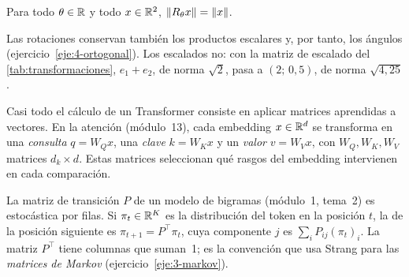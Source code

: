 \addtocounter{figure}{1}%

\begin{proposicion}\label{prop:rotacion}
Para todo $\theta\in\mathbb{R}$ y todo $x\in\mathbb{R}^{2}$, $\lVert R_\theta x\rVert=\lVert x\rVert$.
\end{proposicion}

Las rotaciones conservan también los productos escalares y, por tanto, los ángulos (ejercicio~\ref{eje:4-ortogonal}). Los escalados no: con la matriz de escalado del \cref{tab:transformaciones}, $e_1+e_2$, de norma $\sqrt2$, pasa a $(2;\,0{,}5)$, de norma $\sqrt{4{,}25}$.

\begin{observacion}\label{obs:qkv}
Casi todo el cálculo de un Transformer consiste en aplicar matrices aprendidas a vectores. En la atención (módulo~13), cada embedding $x\in\mathbb{R}^{d}$ se transforma en una \emph{consulta} $q=W_Qx$, una \emph{clave} $k=W_Kx$ y un \emph{valor} $v=W_Vx$, con $W_Q,W_K,W_V$ matrices $d_k\times d$. Estas matrices seleccionan qué rasgos del embedding intervienen en cada comparación.
\end{observacion}

\begin{observacion}
La matriz de transición $P$ de un modelo de bigramas (módulo~1, tema~2) es estocástica por filas. Si $\pi_t\in\mathbb{R}^{K}$ es la distribución del token en la posición $t$, la de la posición siguiente es $\pi_{t+1}=P^{\top}\pi_t$, cuya componente $j$ es $\sum_iP_{ij}(\pi_t)_i$. La matriz $P^{\top}$ tiene columnas que suman~1; es la convención que usa Strang para las \emph{matrices de Markov} (ejercicio~\ref{eje:3-markov}).
\end{observacion}

